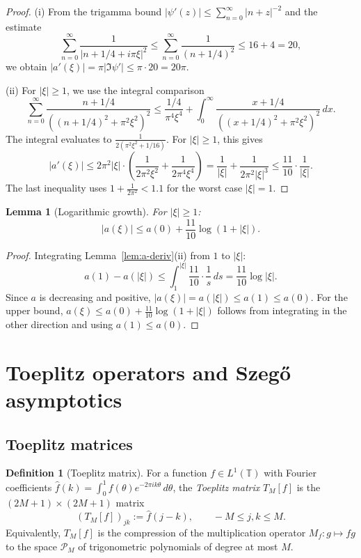 \documentclass[11pt,a4paper]{article}
\newtheorem{lemma}[theorem]{Lemma}
\theoremstyle{definition}
\newtheorem{definition}[theorem]{Definition}
\theoremstyle{remark}
\newcommand{\T}{\mathbb{T}}
\begin{document}
\begin{proof}
(i) From the trigamma bound $|\psi'(z)| \leq \sum_{n=0}^{\infty} |n+z|^{-2}$ and the estimate
\[
  \sum_{n=0}^{\infty} \frac{1}{|n + 1/4 + i\pi\xi|^2} \leq \sum_{n=0}^{\infty} \frac{1}{(n + 1/4)^2} \leq 16 + 4 = 20,
\]
we obtain $|a'(\xi)| = \pi |\Im \psi'| \leq \pi \cdot 20 = 20\pi$.

(ii) For $|\xi| \geq 1$, we use the integral comparison
\[
  \sum_{n=0}^{\infty} \frac{n + 1/4}{((n + 1/4)^2 + \pi^2 \xi^2)^2}
  \leq \frac{1/4}{\pi^4 \xi^4} + \int_0^{\infty} \frac{x + 1/4}{((x + 1/4)^2 + \pi^2 \xi^2)^2}\, dx.
\]
The integral evaluates to $\frac{1}{2(\pi^2 \xi^2 + 1/16)}$. For $|\xi| \geq 1$, this gives
\[
  |a'(\xi)| \leq 2\pi^2 |\xi| \cdot \left( \frac{1}{2\pi^2 \xi^2} + \frac{1}{2\pi^4 \xi^4} \right)
  = \frac{1}{|\xi|} + \frac{1}{2\pi^2 |\xi|^3} \leq \frac{11}{10} \cdot \frac{1}{|\xi|}.
\]
The last inequality uses $1 + \frac{1}{2\pi^2} < 1.1$ for the worst case $|\xi| = 1$.
\end{proof}

\begin{lemma}[Logarithmic growth]\label{lem:a-log}
For $|\xi| \geq 1$:
\[
  |a(\xi)| \leq a(0) + \frac{11}{10} \log(1 + |\xi|).
\]
\end{lemma}

\begin{proof}
Integrating Lemma~\ref{lem:a-deriv}(ii) from $1$ to $|\xi|$:
\[
  a(1) - a(|\xi|) \leq \int_1^{|\xi|} \frac{11}{10} \cdot \frac{1}{s}\, ds = \frac{11}{10} \log |\xi|.
\]
Since $a$ is decreasing and positive, $|a(\xi)| = a(|\xi|) \leq a(1) \leq a(0)$. For the upper bound, $a(\xi) \leq a(0) + \frac{11}{10} \log(1 + |\xi|)$ follows from integrating in the other direction and using $a(1) \leq a(0)$.
\end{proof}

\section{Toeplitz operators and Szeg\H{o} asymptotics}\label{sec:toeplitz}

\subsection{Toeplitz matrices}

\begin{definition}[Toeplitz matrix]
For a function $f \in L^1(\T)$ with Fourier coefficients $\hat{f}(k) = \int_0^1 f(\theta) e^{-2\pi i k \theta}\, d\theta$, the \emph{Toeplitz matrix} $T_M[f]$ is the $(2M+1) \times (2M+1)$ matrix
\[
  (T_M[f])_{jk} := \hat{f}(j - k), \qquad -M \leq j, k \leq M.
\]
Equivalently, $T_M[f]$ is the compression of the multiplication operator $M_f : g \mapsto fg$ to the space $\mathcal{P}_M$ of trigonometric polynomials of degree at most $M$.
\end{definition}
\end{document}
